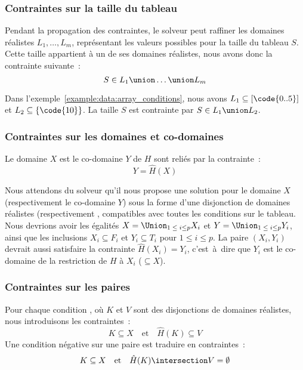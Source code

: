 \subsubsection{Contraintes sur la taille du tableau}

Pendant la propagation des contraintes, le solveur peut raffiner les domaines
réalistes $L_1, \dots, L_m$, représentant les valeurs possibles pour la taille du
tableau $S$. Cette taille appartient à un de ses domaines réalistes, nous avons
donc la contrainte suivante~:
%
$$S \in L_1 \union \dots \union L_m$$

Dans l'exemple~\ref{example:data:array_conditions}, nous avons $L_1 \subseteq
[\code{0..5}]$ et $L_2 \subseteq \{\code{10}\}$. La taille $S$ est contrainte
par $S \in L_1 \union L_2$.

\subsubsection{Contraintes sur les domaines et co-domaines}

Le domaine $X$ est le co-domaine $Y$ de $H$ sont reliés par la contrainte~:
%
$$Y = \hat{H}(X)$$

Nous attendons du solveur qu'il nous propose une solution pour le domaine $X$
(respectivement le co-domaine $Y$) sous la forme d'une disjonction de domaines
réalistes  (respectivement , compatibles avec toutes les conditions sur le tableau. Nous
devrions avoir les égalités $X = \Union_{1 \;\leq\; i \leq p} X_i$ et $Y =
\Union_{1 \;\leq\; i \leq p} Y_i$, ainsi que les inclusions $X_i \subseteq F_i$
et $Y_i \subseteq T_i$ pour $1 \leq i \leq p$. La paire $(X_i, Y_i)$ devrait
aussi satisfaire la contrainte $\hat{H}(X_i) = Y_i$, c'est~à~dire que $Y_i$ est
le co-domaine de la restriction de $H$ à $X_i$ ($\subseteq X$).

\subsubsection{Contraintes sur les paires}

Pour chaque condition , où $K$ et $V$ sont des disjonctions de
domaines réalistes, nous introduisons les contraintes~:
%
$$K \subseteq X \quad\mathrm{et}\quad \hat{H}(K) \subseteq V$$
%
Une condition négative sur une paire  est traduire en
contraintes~:
%
$$K \subseteq X \quad\mathrm{et}\quad \hat{H}(K) \intersection V = \emptyset$$

